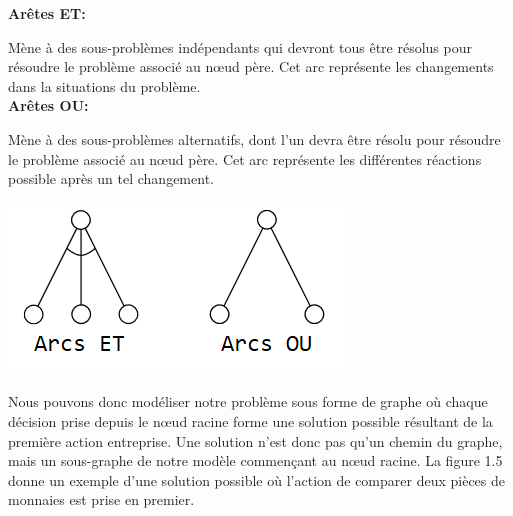 {\setlength{\parindent}{0cm}\textbf{Arêtes ET:}}

Mène à des sous-problèmes indépendants qui devront tous être résolus pour résoudre le problème associé au nœud père. Cet arc représente les changements dans la situations du problème.\\

{\setlength{\parindent}{0cm}\textbf{Arêtes OU:}}

Mène à des sous-problèmes alternatifs, dont l'un devra être résolu pour résoudre le problème associé au nœud père. Cet arc représente les différentes réactions possible après un tel changement.

\begin{center}
    \includegraphics[scale=0.8]{../ressources/images/ET_OU_arcs.png}
\end{center}

Nous pouvons donc modéliser notre problème sous forme de graphe où chaque décision prise depuis le nœud racine forme une solution possible résultant de la première action entreprise. Une solution n'est donc pas qu'un chemin du graphe, mais un sous-graphe de notre modèle commençant au nœud racine. La figure 1.5 donne un exemple d'une solution possible où l'action de comparer deux pièces de monnaies est prise en premier.

